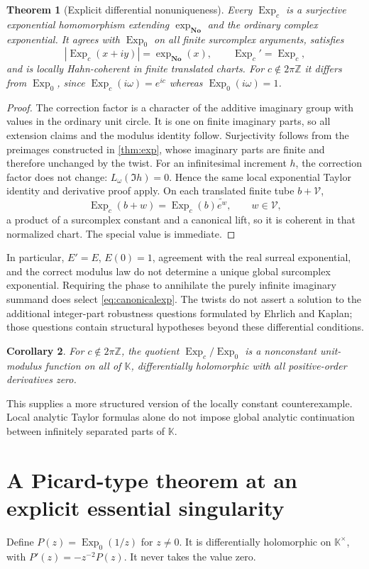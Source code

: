 \documentclass[11pt,oneside]{article}
\numberwithin{equation}{section}
\newtheorem{theorem}{Theorem}[section]
\newtheorem{corollary}[theorem]{Corollary}
\theoremstyle{definition}
\theoremstyle{remark}\newtheorem{remark}[theorem]{Remark}
\newcommand{\No}{\mathbf{No}}
\newcommand{\K}{\mathbb K}
\newcommand{\Z}{\mathbb Z}
\newcommand{\fin}{\mathcal V}
\newcommand{\Exp}{\operatorname{Exp}}
\begin{document}
\begin{theorem}[Explicit differential nonuniqueness]\label{thm:twists}
Every $\Exp_c$ is a surjective exponential homomorphism extending
$\exp_{\No}$ and the ordinary complex exponential. It agrees with
$\Exp_0$ on all finite surcomplex arguments, satisfies
\[
 |\Exp_c(x+iy)|=\exp_{\No}(x),\qquad \Exp_c'=\Exp_c,
\]
and is locally Hahn-coherent in finite translated charts.
For $c\notin2\pi\Z$ it differs from $\Exp_0$, since
$\Exp_c(i\omega)=e^{ic}$ whereas $\Exp_0(i\omega)=1$.
\end{theorem}
\begin{proof}
The correction factor is a character of the additive imaginary group
with values in the ordinary unit circle. It is one on finite imaginary
parts, so all extension claims and the modulus identity follow.
Surjectivity follows from the preimages constructed in \cref{thm:exp},
whose imaginary parts are finite and therefore unchanged by the twist.
For an infinitesimal increment $h$, the correction factor does not change:
$L_\omega(\Im h)=0$. Hence the same local exponential Taylor identity
and derivative proof apply. On each translated finite tube $b+\fin$,
\[
 \Exp_c(b+w)=\Exp_c(b)\widetilde{e^w},\qquad w\in\fin,
\]
a product of a surcomplex constant and a canonical lift, so it is
coherent in that normalized chart. The special value is immediate.
\end{proof}
In particular, $E'=E$, $E(0)=1$, agreement with the real surreal
exponential, and the correct modulus law do not determine a unique
global surcomplex exponential. Requiring the phase to annihilate the
purely infinite imaginary summand does select \eqref{eq:canonicalexp}.
The twists do not assert a solution to the additional integer-part
robustness questions formulated by Ehrlich and Kaplan; those questions
contain structural hypotheses beyond these differential conditions.

\begin{corollary}
For $c\notin2\pi\Z$, the quotient $\Exp_c/\Exp_0$ is a nonconstant
unit-modulus function on all of $\K$, differentially holomorphic with
all positive-order derivatives zero.
\end{corollary}
This supplies a more structured version of the locally constant
counterexample. Local analytic Taylor formulas alone do not impose global
analytic continuation between infinitely separated parts of $\K$.

\section{A Picard-type theorem at an explicit essential singularity}
Define $P(z)=\Exp_0(1/z)$ for $z\ne0$. It is differentially holomorphic
on $\K^\times$, with $P'(z)=-z^{-2}P(z)$. It never takes the value zero.
\end{document}
